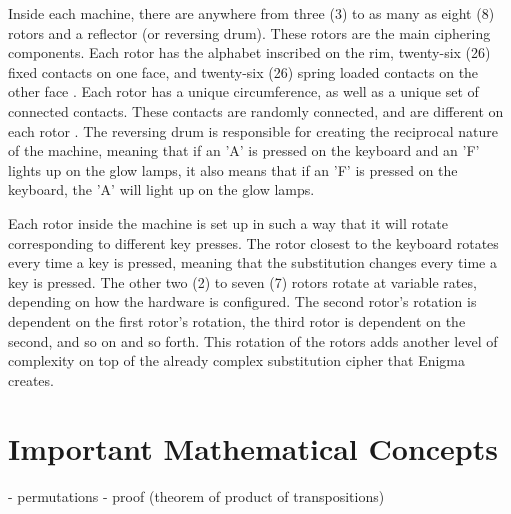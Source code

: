 Inside each machine, there are anywhere from three (3) to as many as eight (8) rotors and a reflector (or reversing drum). These rotors are the main ciphering components. Each rotor has the alphabet inscribed on the rim, twenty-six (26) fixed contacts on one face, and twenty-six (26) spring loaded contacts on the other face \cite{wk85}. Each rotor has a unique circumference, as well as a unique set of connected contacts. These contacts are randomly connected, and are different on each rotor \cite{bw05}. The reversing drum is responsible for creating the reciprocal nature of the machine, meaning that if an 'A' is pressed on the keyboard and an 'F' lights up on the glow lamps, it also means that if an 'F' is pressed on the keyboard, the 'A' will light up on the glow lamps.

Each rotor inside the machine is set up in such a way that it will rotate corresponding to different key presses. The rotor closest to the keyboard rotates every time a key is pressed, meaning that the substitution changes every time a key is pressed. The other two (2) to seven (7) rotors rotate at variable rates, depending on how the hardware is configured. The second rotor's rotation is dependent on the first rotor's rotation, the third rotor is dependent on the second, and so on and so forth. This rotation of the rotors adds another level of complexity on top of the already complex substitution cipher that Enigma creates.

\section{Important Mathematical Concepts}
- permutations
- proof (theorem of product of transpositions)
